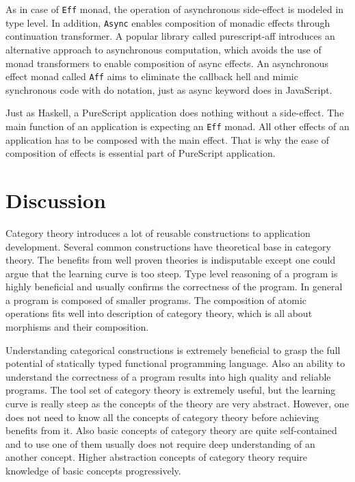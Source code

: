 \documentclass[article]{aaltoseries}
\begin{document}
      As in case of \lstinline|Eff| monad, the operation of asynchronous side-effect is
      modeled in type level. In addition, \lstinline|Async| enables composition of monadic
      effects through continuation transformer. A popular library called
      purescript-aff introduces an alternative approach to asynchronous
      computation, which avoids the use of monad transformers to enable
      composition of async effects. An asynchronous effect monad called \lstinline|Aff| aims
      to eliminate the callback hell and mimic synchronous code with do
      notation, just as async keyword does in JavaScript.
 
      Just as Haskell, a PureScript application does nothing without a
      side-effect. The main function of an application is expecting an \lstinline|Eff|
      monad. All other effects of an application has to be composed with the
      main effect. That is why the ease of composition of effects is essential
      part of PureScript application.


\section{Discussion}

Category theory introduces a lot of reusable constructions to application
development. Several common constructions have theoretical base in category
theory. The benefits from well proven theories is indisputable except one could
argue that the learning curve is too steep. Type level reasoning of a program is
highly beneficial and usually confirms the correctness of the program. In
general a program is composed of smaller programs. The composition of atomic
operations fits well into description of category theory, which is all about
morphisms and their composition.
 
Understanding categorical constructions is extremely beneficial to grasp the
full potential of statically typed functional programming language. Also an
ability to understand the correctness of a program results into high quality and
reliable programs. The tool set of category theory is extremely useful, but the
learning curve is really steep as the concepts of the theory are very abstract.
However, one does not need to know all the concepts of category theory before
achieving benefits from it. Also basic concepts of category theory are quite
self-contained and to use one of them usually does not require deep
understanding of an another concept. Higher abstraction concepts of category
theory require knowledge of basic concepts progressively.
 
\end{document}
